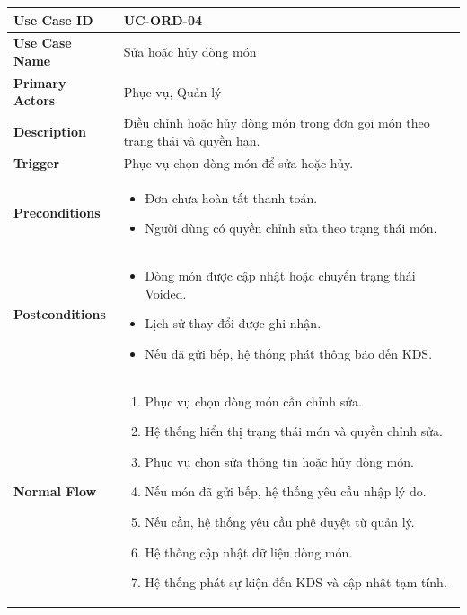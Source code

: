 \begin{longtable}{|p{4cm}|p{10cm}|}
\hline
\textbf{Use Case ID} & UC-ORD-04 \\ \hline
\textbf{Use Case Name} & Sửa hoặc hủy dòng món \\ \hline
\textbf{Primary Actors} & Phục vụ, Quản lý \\ \hline

\textbf{Description} & Điều chỉnh hoặc hủy dòng món trong đơn gọi món theo trạng thái và quyền hạn. \\ \hline

\textbf{Trigger} & Phục vụ chọn dòng món để sửa hoặc hủy. \\ \hline

\textbf{Preconditions} &
\begin{itemize}[leftmargin=*, noitemsep]
  \item Đơn chưa hoàn tất thanh toán.
  \item Người dùng có quyền chỉnh sửa theo trạng thái món.
\end{itemize} \\ \hline

\textbf{Postconditions} &
\begin{itemize}[leftmargin=*, noitemsep]
  \item Dòng món được cập nhật hoặc chuyển trạng thái \textsf{Voided}.
  \item Lịch sử thay đổi được ghi nhận.
  \item Nếu đã gửi bếp, hệ thống phát thông báo đến KDS.
\end{itemize} \\ \hline

\textbf{Normal Flow} &
\begin{enumerate}[leftmargin=*, noitemsep]
  \item Phục vụ chọn dòng món cần chỉnh sửa.
  \item Hệ thống hiển thị trạng thái món và quyền chỉnh sửa.
  \item Phục vụ chọn sửa thông tin hoặc hủy dòng món.
  \item Nếu món đã gửi bếp, hệ thống yêu cầu nhập lý do.
  \item Nếu cần, hệ thống yêu cầu phê duyệt từ quản lý.
  \item Hệ thống cập nhật dữ liệu dòng món.
  \item Hệ thống phát sự kiện đến KDS và cập nhật tạm tính.
\end{enumerate} \\ \hline


\end{longtable}

